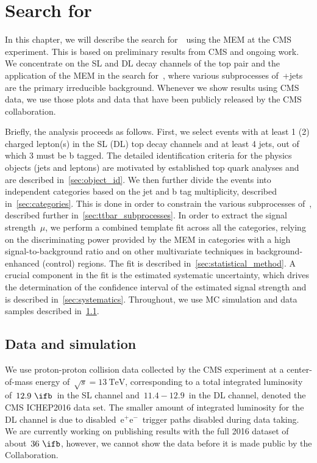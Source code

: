 \chapter{Search for \ttHbb}

In this chapter, we will describe the search for~\ttHbb~using the MEM at the CMS experiment. This is based on preliminary results from CMS\cite{CMS-PAS-HIG-16-038} and ongoing work. We concentrate on the SL and DL decay channels of the top pair and the application of the MEM in the search for~\ttHbb, where various subprocesses of~\ttbar+jets are the primary irreducible background. Whenever we show results using CMS data, we use those plots and data that have been publicly released by the CMS collaboration.

Briefly, the analysis proceeds as follows. First, we select events with at least 1 (2) charged lepton(s) in the SL (DL) top decay channels and at least 4 jets, out of which 3 must be b tagged. The detailed identification criteria for the physics objects (jets and leptons) are motivated by established top quark analyses and are described in~\cref{sec:object_id}. We then further divide the events into independent categories based on the jet and b tag multiplicity, described in~\cref{sec:categories}. This is done in order to constrain the various subprocesses of~\ttbar, described further in~\cref{sec:ttbar_subprocesses}. In order to extract the signal strength~$\mu$, we perform a combined template fit across all the categories, relying on the discriminating power provided by the MEM in categories with a high signal-to-background ratio and on other multivariate techniques in background-enhanced (control) regions. The fit is described in~\cref{sec:statistical_method}.
A crucial component in the fit is the estimated systematic uncertainty, which drives the determination of the confidence interval of the estimated signal strength and is described in~\cref{sec:systematics}. Throughout, we use MC simulation and data samples described in~\cref{sec:data_mc}.

\section{Data and simulation}
\label{sec:data_mc}

We use proton-proton collision data collected by the CMS experiment at a center-of-mass energy of~$\sqrt{s} = 13~\mathrm{TeV}$, corresponding to a total integrated luminosity of~$12.9~\ifb$~in the SL channel and~$11.4-12.9$~in the DL channel, denoted the CMS ICHEP2016 data set. The smaller amount of integrated luminosity for the DL channel is due to disabled~$\mathrm{e}^+\mathrm{e}^-$~trigger paths disabled during data taking. We are currently working on publishing results with the full 2016 dataset of about~$36~\ifb$, however, we cannot show the data before it is made public by the Collaboration.

